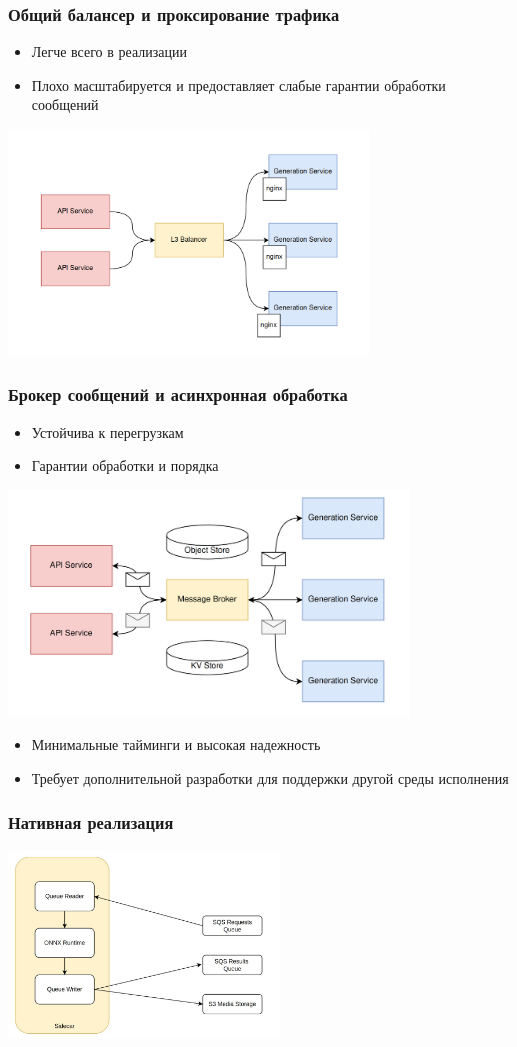 \documentclass{beamer}
\begin{document}
\begin{frame}
	\frametitle{Общий балансер и проксирование трафика}
	\begin{itemize}
		\item Легче всего в реализации
		\item Плохо масштабируется и предоставляет слабые гарантии обработки сообщений
	\end{itemize}
	\centering
	\includegraphics[height=6cm]{img/balancer_old.png}
\end{frame}

\begin{frame}
	\frametitle{Брокер сообщений и асинхронная обработка}
	\begin{itemize}
		\item Устойчива к перегрузкам
		\item Гарантии обработки и порядка
	\end{itemize}
	\centering
	\includegraphics[height=6cm]{img/arch_new.png}
\end{frame}

\begin{frame}
	\begin{itemize}
		\item Минимальные тайминги и высокая надежность
		\item Требует дополнительной разработки для поддержки другой среды исполнения
	\end{itemize}
	\frametitle{Нативная реализация}
	\centering
	\includegraphics[height=5cm]{img/side1.jpg}
\end{frame}
\end{document}
